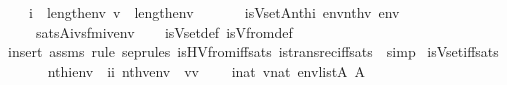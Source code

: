 \begin{isabellebody}
\ \ \ \ {\isachardoublequoteopen}i\ {\isacharless}{\kern0pt}\ length{\isacharparenleft}{\kern0pt}env{\isacharparenright}{\kern0pt}{\isachardoublequoteclose}\ {\isachardoublequoteopen}v\ {\isacharless}{\kern0pt}\ length{\isacharparenleft}{\kern0pt}env{\isacharparenright}{\kern0pt}{\isachardoublequoteclose}\isanewline
\ \ \isanewline
\ \ \ \ {\isachardoublequoteopen}is{\isacharunderscore}{\kern0pt}Vset{\isacharparenleft}{\kern0pt}{\isacharhash}{\kern0pt}{\isacharhash}{\kern0pt}A{\isacharcomma}{\kern0pt}nth{\isacharparenleft}{\kern0pt}i{\isacharcomma}{\kern0pt}\ env{\isacharparenright}{\kern0pt}{\isacharcomma}{\kern0pt}nth{\isacharparenleft}{\kern0pt}v{\isacharcomma}{\kern0pt}\ env{\isacharparenright}{\kern0pt}{\isacharparenright}{\kern0pt}\isanewline
\ \ \ \ {\isasymlongleftrightarrow}\ sats{\isacharparenleft}{\kern0pt}A{\isacharcomma}{\kern0pt}{\isacharquery}{\kern0pt}ivs{\isacharunderscore}{\kern0pt}fm{\isacharparenleft}{\kern0pt}i{\isacharcomma}{\kern0pt}v{\isacharparenright}{\kern0pt}{\isacharcomma}{\kern0pt}env{\isacharparenright}{\kern0pt}{\isachardoublequoteclose}\isanewline
%
\isadelimproof
\ \ %
\endisadelimproof
%
\isatagproof
{}\isamarkupfalse%
\ is{\isacharunderscore}{\kern0pt}Vset{\isacharunderscore}{\kern0pt}def\ is{\isacharunderscore}{\kern0pt}Vfrom{\isacharunderscore}{\kern0pt}def\isanewline
\ \ \isamarkupfalse%
\ {\isacharparenleft}{\kern0pt}insert\ assms{\isacharsemicolon}{\kern0pt}\ {\isacharparenleft}{\kern0pt}rule\ sep{\isacharunderscore}{\kern0pt}rules\ is{\isacharunderscore}{\kern0pt}HVfrom{\isacharunderscore}{\kern0pt}iff{\isacharunderscore}{\kern0pt}sats\ is{\isacharunderscore}{\kern0pt}transrec{\isacharunderscore}{\kern0pt}iff{\isacharunderscore}{\kern0pt}sats\ {\isacharbar}{\kern0pt}\ simp{\isacharparenright}{\kern0pt}{\isacharplus}{\kern0pt}{\isacharparenright}{\kern0pt}%
\endisatagproof
{\isafoldproof}%
%
\isadelimproof
\isanewline
%
\endisadelimproof
\isanewline
{}\isamarkupfalse%
\ is{\isacharunderscore}{\kern0pt}Vset{\isacharunderscore}{\kern0pt}iff{\isacharunderscore}{\kern0pt}sats{\isacharcolon}{\kern0pt}\isanewline
\ \ \isanewline
\ \ \ \ {\isachardoublequoteopen}nth{\isacharparenleft}{\kern0pt}i{\isacharcomma}{\kern0pt}env{\isacharparenright}{\kern0pt}\ {\isacharequal}{\kern0pt}\ ii{\isachardoublequoteclose}\ {\isachardoublequoteopen}nth{\isacharparenleft}{\kern0pt}v{\isacharcomma}{\kern0pt}env{\isacharparenright}{\kern0pt}\ {\isacharequal}{\kern0pt}\ vv{\isachardoublequoteclose}\isanewline
\ \ \ \ {\isachardoublequoteopen}i{\isasymin}nat{\isachardoublequoteclose}\ {\isachardoublequoteopen}v{\isasymin}nat{\isachardoublequoteclose}\ {\isachardoublequoteopen}env{\isasymin}list{\isacharparenleft}{\kern0pt}A{\isacharparenright}{\kern0pt}{\isachardoublequoteclose}\ {\isachardoublequoteopen}{}{\isasymin}A{\isachardoublequoteclose}\isanewline

\end{isabellebody}
